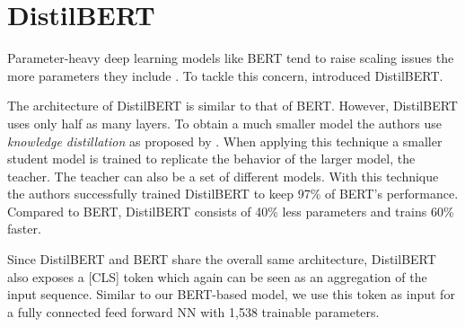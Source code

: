 \section{DistilBERT}
\label{chp:approach:sec:distilbert}

Parameter-heavy deep learning models like \ac{BERT} tend to raise scaling issues the more parameters they include \parencite{Schwartz:2019}.
To tackle this concern, \textcite{Sanh:2019} introduced \ac{DistilBERT}.

The architecture of \ac{DistilBERT} is similar to that of \ac{BERT}.
However, \ac{DistilBERT} uses only half as many layers.
To obtain a much smaller model the authors use \textit{knowledge distillation} as proposed by \textcites{Bucilua:2006}{Hinton:2015}.
When applying this technique a smaller student model is trained to replicate the behavior of the larger model, the teacher.
The teacher can also be a set of different models.
With this technique the authors successfully trained \ac{DistilBERT} to keep 97\% of \ac{BERT}'s performance.
Compared to \ac{BERT}, \ac{DistilBERT} consists of 40\% less parameters and trains 60\% faster. \parencite{Sanh:2019}

Since \ac{DistilBERT} and \ac{BERT} share the overall same architecture, \ac{DistilBERT} also exposes a [CLS] token which again can be seen as an aggregation of the input sequence.
Similar to our \ac{BERT}-based model, we use this token as input for a fully connected feed forward \ac{NN} with 1,538 trainable parameters.
